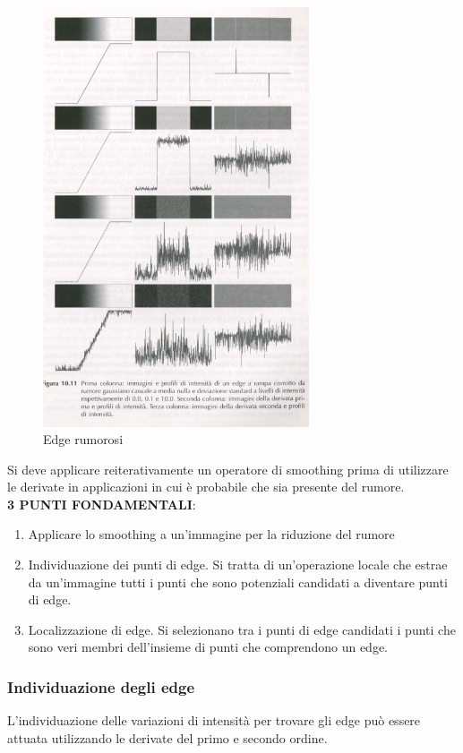 \documentclass[12pt]{article}
\begin{document}
\begin{figure}[!htb]
    \centering
    \includegraphics[width=0.7\textwidth]{Images/derrumore.png}
    \caption{Edge rumorosi}
\end{figure}
\FloatBarrier
Si deve applicare reiterativamente un operatore di smoothing prima di utilizzare le derivate in applicazioni in cui è probabile che sia presente del rumore.
\\\textbf{3 PUNTI FONDAMENTALI}:
\begin{enumerate}
    \item Applicare lo smoothing a un'immagine per la riduzione del rumore
    \item Individuazione dei punti di edge. Si tratta di un'operazione locale che estrae da un'immagine tutti i punti che sono potenziali candidati a diventare punti di edge.
    \item Localizzazione di edge. Si selezionano tra i punti di edge candidati i punti che sono veri membri dell'insieme di punti che comprendono un edge.
\end{enumerate}
\subsubsection{Individuazione degli edge}
L'individuazione delle variazioni di intensità per trovare gli edge può essere attuata utilizzando le derivate del primo e secondo ordine.
\end{document}
